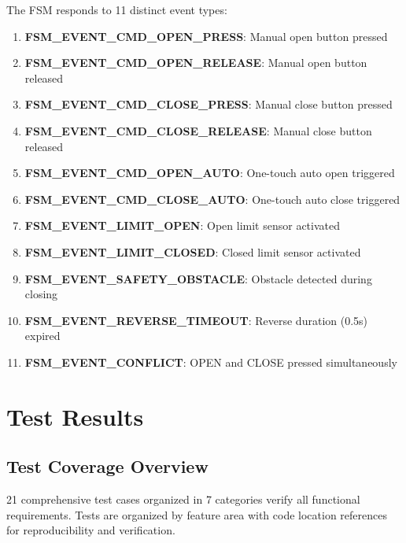 \documentclass[11pt,a4paper]{article}
\begin{document}
The FSM responds to 11 distinct event types:
\begin{enumerate}
    \item \textbf{FSM\_EVENT\_CMD\_OPEN\_PRESS}: Manual open button pressed
    \item \textbf{FSM\_EVENT\_CMD\_OPEN\_RELEASE}: Manual open button released
    \item \textbf{FSM\_EVENT\_CMD\_CLOSE\_PRESS}: Manual close button pressed
    \item \textbf{FSM\_EVENT\_CMD\_CLOSE\_RELEASE}: Manual close button released
    \item \textbf{FSM\_EVENT\_CMD\_OPEN\_AUTO}: One-touch auto open triggered
    \item \textbf{FSM\_EVENT\_CMD\_CLOSE\_AUTO}: One-touch auto close triggered
    \item \textbf{FSM\_EVENT\_LIMIT\_OPEN}: Open limit sensor activated
    \item \textbf{FSM\_EVENT\_LIMIT\_CLOSED}: Closed limit sensor activated
    \item \textbf{FSM\_EVENT\_SAFETY\_OBSTACLE}: Obstacle detected during closing
    \item \textbf{FSM\_EVENT\_REVERSE\_TIMEOUT}: Reverse duration (0.5s) expired
    \item \textbf{FSM\_EVENT\_CONFLICT}: OPEN and CLOSE pressed simultaneously
\end{enumerate}

\section{Test Results}

\subsection{Test Coverage Overview}

21 comprehensive test cases organized in 7 categories verify all functional requirements. Tests are organized by feature area with code location references for reproducibility and verification.
\end{document}
